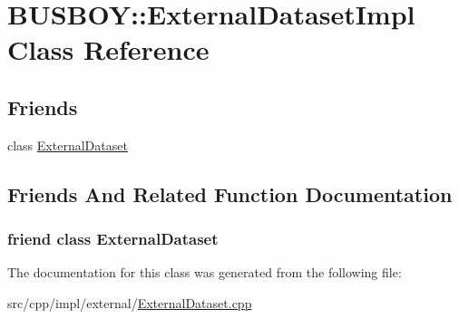 \hypertarget{classBUSBOY_1_1ExternalDatasetImpl}{
\section{BUSBOY::ExternalDatasetImpl Class Reference}
\label{classBUSBOY_1_1ExternalDatasetImpl}
}
\subsection*{Friends}
\begin{DoxyCompactItemize}
\item 
class \hyperlink{classBUSBOY_1_1ExternalDatasetImpl_ac79fe37be7290c3dd261dd24256fa07a}{ExternalDataset}
\end{DoxyCompactItemize}


\subsection{Friends And Related Function Documentation}
\hypertarget{classBUSBOY_1_1ExternalDatasetImpl_ac79fe37be7290c3dd261dd24256fa07a}{
\subsubsection[{ExternalDataset}]{\setlength{\rightskip}{0pt plus 5cm}friend class {\bf ExternalDataset}}}
\label{classBUSBOY_1_1ExternalDatasetImpl_ac79fe37be7290c3dd261dd24256fa07a}


The documentation for this class was generated from the following file:\begin{DoxyCompactItemize}
\item 
src/cpp/impl/external/\hyperlink{ExternalDataset_8cpp}{ExternalDataset.cpp}\end{DoxyCompactItemize}
